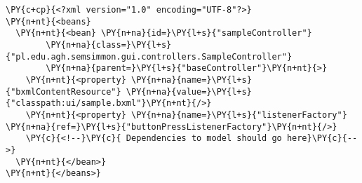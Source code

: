 \begin{Verbatim}[commandchars=\\\{\}]
\PY{c+cp}{<?xml version="1.0" encoding="UTF-8"?>}
\PY{n+nt}{<beans}
  \PY{n+nt}{<bean} \PY{n+na}{id=}\PY{l+s}{"sampleController"} 
        \PY{n+na}{class=}\PY{l+s}{"pl.edu.agh.semsimmon.gui.controllers.SampleController"}
        \PY{n+na}{parent=}\PY{l+s}{"baseController"}\PY{n+nt}{>}
    \PY{n+nt}{<property} \PY{n+na}{name=}\PY{l+s}{"bxmlContentResource"} \PY{n+na}{value=}\PY{l+s}{"classpath:ui/sample.bxml"}\PY{n+nt}{/>}
    \PY{n+nt}{<property} \PY{n+na}{name=}\PY{l+s}{"listenerFactory"} \PY{n+na}{ref=}\PY{l+s}{"buttonPressListenerFactory"}\PY{n+nt}{/>}
    \PY{c}{<!--}\PY{c}{ Dependencies to model should go here}\PY{c}{-->}
  \PY{n+nt}{</bean>}
\PY{n+nt}{</beans>}
\end{Verbatim}
